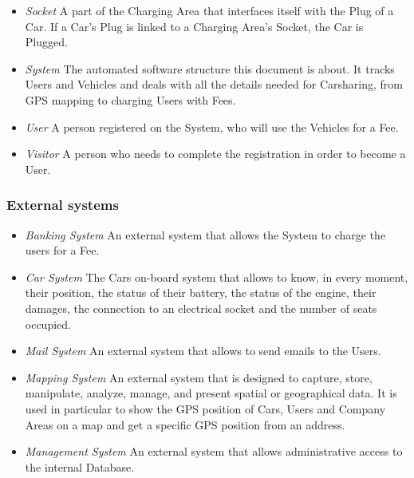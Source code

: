 \begin{itemize}
	\item \emph{Socket}
	A part of the Charging Area that interfaces itself with the Plug of a Car. If a Car's Plug is linked to a Charging Area's Socket, the Car is Plugged.

	\item \emph{System}
	The automated software structure this document is about.
	It tracks Users and Vehicles and deals with all the details needed for Carsharing, from GPS mapping to charging Users with Fees.

	\item \emph{User}
	A person registered on the System, who will use the Vehicles for a Fee.

	\item \emph{Visitor}
	A person who needs to complete the registration in order to become a User.
\end{itemize}

\subsubsection{External systems}
\begin{itemize}
	\item \emph{Banking System}
	An external system that allows the System to charge the users for a Fee.
		
	\item \emph{Car System}
	The Cars on-board system that allows to know, in every moment, their position, the status of their battery, the status of the engine, their damages, the connection to an electrical socket and the number of seats occupied.

	\item \emph{Mail System}
	An external system that allows to send emails to the Users.

	\item \emph{Mapping System}
	An external system that is designed to capture, store, manipulate, analyze, manage, and present spatial or geographical data. 
	It is used in particular to show the GPS position of Cars, Users and Company Areas on a map and get a specific GPS position from an address.
	
	\item \emph{Management System}
	An external system that allows administrative access to the internal Database.
\end{itemize}

